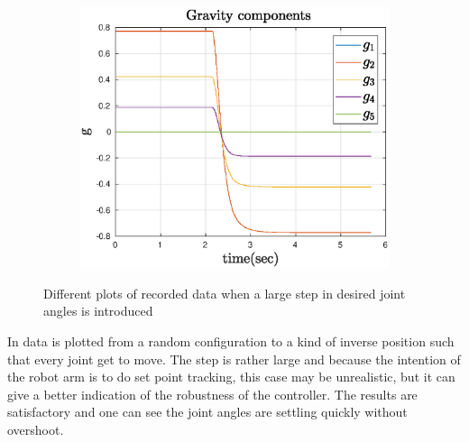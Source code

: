 \begin{figure}[htbp]
\begin{subfigure}[htbp]{0.45\textwidth}
        \caption{ }
    \end{subfigure}
    ~
    \begin{subfigure}[htbp]{0.45\textwidth}
        \centering
        \includegraphics[width = \picsSiz\linewidth]{img/LSgrav.eps}
        \caption{ }
    \end{subfigure}
    \caption{Different plots of recorded data when a large step in desired joint angles is introduced}
    \label{fig:LS}
\end{figure}
In  data is plotted from a random configuration to a kind of inverse position such that every joint get to move. The step is rather large and because the intention of the robot arm is to do set point tracking, this case may be unrealistic, but it can give a better indication of the robustness of the controller. The results are satisfactory and one can see the joint angles are settling quickly without overshoot.




